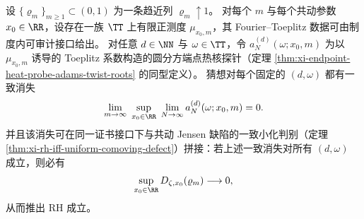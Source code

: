 
\begin{conjecture}[圆分方原子消失触发共动缺陷链闭合]\label{conj:xi-cyclotomic-atom-vanishing-jensen-chain-closure}
设 \(\{\varrho_m\}_{m\ge 1}\subset(0,1)\) 为一条趋近列 \(\varrho_m\uparrow 1\)。
对每个 \(m\) 与每个共动参数 \(x_0\in\RR\)，设存在一族 \(\TT\) 上有限正测度 \(\mu_{x_0,m}\)，其 Fourier--Toeplitz 数据可由制度内可审计接口给出。
对任意 \(d\in\NN\) 与 \(\omega\in\TT\)，令 \(a_N^{(d)}(\omega;x_0,m)\) 为以 \(\mu_{x_0,m}\) 诱导的 Toeplitz 系数构造的圆分方端点热核探针（定理 \ref{thm:xi-endpoint-heat-probe-adams-twist-roots} 的同型定义）。
猜想对每个固定的 \((d,\omega)\) 都有一致消失
\[
\lim_{m\to\infty}\ \sup_{x_0\in\RR}\ \lim_{N\to\infty}a_N^{(d)}(\omega;x_0,m)=0.
\]
并且该消失可在同一证书接口下与共动 Jensen 缺陷的一致小化判别（定理 \ref{thm:xi-rh-iff-uniform-comoving-defect}）拼接：若上述一致消失对所有 \((d,\omega)\) 成立，则必有
\[
\sup_{x_0\in\RR}D_{\zeta,x_0}(\varrho_m)\longrightarrow 0,
\]
从而推出 RH 成立。
\end{conjecture}

